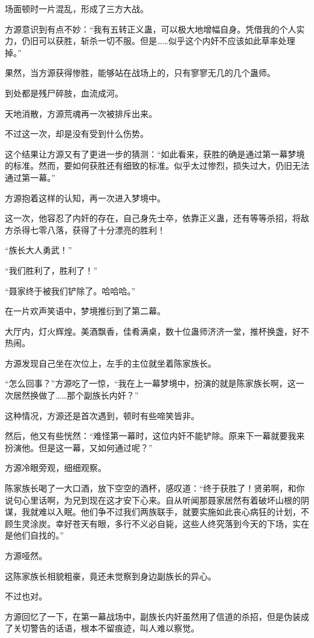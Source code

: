 \begin{this_body}
场面顿时一片混乱，形成了三方大战。

方源意识到有点不妙：“我有五转正义蛊，可以极大地增幅自身。凭借我的个人实力，仍旧可以获胜，斩杀一切不服。但是……似乎这个内奸不应该如此草率处理掉。”

果然，当方源获得惨胜，能够站在战场上的，只有寥寥无几的几个蛊师。

到处都是残尸碎肢，血流成河。

天地消散，方源荒魂再一次被排斥出来。

不过这一次，却是没有受到什么伤势。

这个结果让方源又有了更进一步的猜测：“如此看来，获胜的确是通过第一幕梦境的标准。然而，要如何获胜还有细致的标准。似乎太过惨烈，损失过大，仍旧无法通过第一幕。”

方源抱着这样的认知，再一次进入梦境中。

这一次，他容忍了内奸的存在，自己身先士卒，依靠正义蛊，还有等等杀招，将敌方杀得七零八落，获得了十分漂亮的胜利！

“族长大人勇武！”

“我们胜利了，胜利了！”

“聂家终于被我们铲除了。哈哈哈。”

在一片欢声笑语中，梦境推衍到了第二幕。

大厅内，灯火辉煌。美酒飘香，佳肴满桌，数十位蛊师济济一堂，推杯换盏，好不热闹。

方源发现自己坐在次位上，左手的主位就坐着陈家族长。

“怎么回事？”方源吃了一惊，“我在上一幕梦境中，扮演的就是陈家族长啊，这一次居然换做了……那个副族长内奸？”

这种情况，方源还是首次遇到，顿时有些啼笑皆非。

然后，他又有些恍然：“难怪第一幕时，这位内奸不能铲除。原来下一幕就要我来扮演他。但是这一幕，又如何通过呢？”

方源冷眼旁观，细细观察。

陈家族长喝了一大口酒，放下空空的酒杯，感叹道：“终于获胜了！贤弟啊，和你说句心里话啊，为兄到现在这才安下心来。自从听闻那聂家居然有着破坏山根的阴谋，我就难以入眠。他们争不过我们两族联手，就要实施如此丧心病狂的计划，不顾生灵涂炭。幸好苍天有眼，多行不义必自毙，这些人终究落到今天的下场，实在是他们自找的。”

方源哑然。

这陈家族长相貌粗豪，竟还未觉察到身边副族长的异心。

不过也对。

方源回忆了一下，在第一幕战场中，副族长内奸虽然用了信道的杀招，但是伪装成了关切警告的话语，根本不留痕迹，叫人难以察觉。


\end{this_body}

